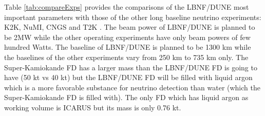Table \ref{tab:compareExps} provides the comparisons of the LBNF/DUNE most important parameters with those of the other long baseline neutrino experiments: K2K, NuMI, CNGS and T2K \cite{ref_LBN_OscExpReview}. The beam power of LBNF/DUNE is planned to be 2MW while the other operating experiments have only beam powers of few hundred Watts. The baseline of LBNF/DUNE is planned to be 1300 km while the baselines of the other experiments vary from 250 km to 735 km only. The Super-Kamiokande FD has a larger mass than the LBNF/DUNE FD is going to have (50 kt vs 40 kt) but the LBNF/DUNE FD will be filled with liquid argon which is a more favorable substance for neutrino detection than water (which the Super-Kamiokande FD is filled with). The only FD which has liquid argon as working volume is ICARUS but its mass is only 0.76 kt. \\ \\
